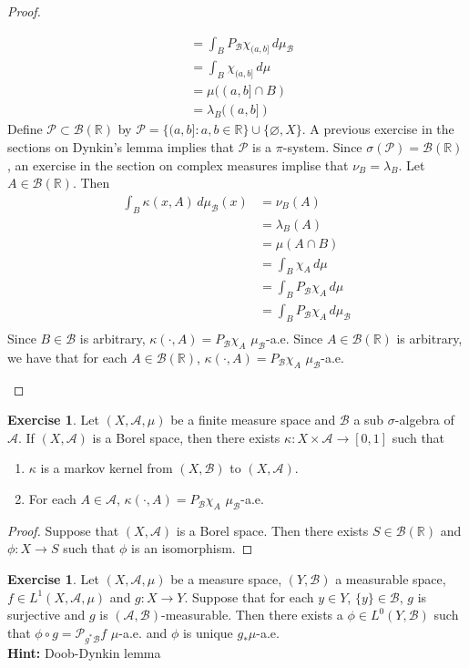 \documentclass[12pt]{amsart}
\theoremstyle{definition}
\newtheorem{ex}[definition]{Exercise}
\newcommand{\lam}{\lambda}
\newcommand{\sig}{\sigma}
\newcommand{\kap}{\kappa}
\newcommand{\R}{\mathbb{R}}
\newcommand{\MA}{\mathcal{A}}
\newcommand{\MB}{\mathcal{B}}
\newcommand{\MP}{\mathcal{P}}
\newcommand{\dmu}{\, d \mu}
\begin{document}
\begin{proof}
\begin{enumerate}
\begin{align*}
				& = \int_{B} P_{\MB}\chi_{(a, b]} \dmu_{\MB} \\
				& = \int_{B} \chi_{(a, b]} \dmu  \\
				& = \mu((a,b] \cap B) \\
				& = \lam_{B}((a,b])
			\end{align*}
			Define $\MP \subset \MB(\R)$ by $\MP = \{(a,b]: a,b \in \R\} \cup \{\varnothing, X\}$. A previous exercise in the sections on Dynkin's lemma implies that $\MP$ is a $\pi$-system. Since $\sig(\MP) = \MB(\R)$, an exercise in the section on complex measures implise that $\nu_{B} = \lam_{B}$. Let $A \in \MB(\R)$. Then 
			\begin{align*}
				\int_B \kap(x, A) \dmu_{\MB}(x) 
				& = \nu_B(A) \\
				& = \lam_{B}(A) \\
				& =  \mu(A \cap B) \\
				& = \int_B \chi_A \dmu \\
				& = \int_B P_{\MB} \chi_A \dmu \\
				& = \int_B P_{\MB} \chi_A \dmu_{\MB} \\
			\end{align*}
			Since $B \in \MB$ is arbitrary, $\kap(\cdot, A) = P_{\MB} \chi_A$ $\mu_{\MB}$-a.e. Since $A \in \MB(\R)$ is arbitrary, we have that for each $A \in \MB(\R)$, $\kap(\cdot, A) = P_{\MB} \chi_A$ $\mu_{\MB}$-a.e.
		\end{enumerate}
	\end{proof}

	\begin{ex}
		Let $(X, \MA, \mu)$ be a finite measure space and $\MB$ a sub $\sig$-algebra of $\MA$. If $(X, \MA)$ is a Borel space, then there exists $\kap: X \times \MA \rightarrow [0,1]$ such that 
		\begin{enumerate}
			\item $\kap$ is a markov kernel from $(X, \MB)$ to $(X, \MA)$.
			\item For each $A \in \MA$, $\kap(\cdot, A) = P_{\MB}\chi_{A}$ $\mu_{\MB}$-a.e.
		\end{enumerate}
	\end{ex}

	\begin{proof}
		Suppose that $(X, \MA)$ is a Borel space. Then there exists $S \in \MB(\R)$ and $\phi: X \rightarrow S$ such that $\phi$ is an isomorphism.
	\end{proof}
	
	\begin{ex} 
		Let $(X, \MA, \mu)$ be a measure space, $(Y, \MB)$ a measurable space, $f \in L^1(X, \MA, \mu)$ and $g: X \rightarrow Y$. Suppose that for each $y \in Y$, $\{y\} \in \MB$, $g$ is surjective and $g$ is $(\MA, \MB)$-measurable. Then there exists a $\phi \in L^0(Y, \MB)$ such that $\phi \circ g = \MP_{g^*\MB}f$ $\mu$-a.e. and $\phi$ is unique $g_*\mu$-a.e. \\
		\textbf{Hint:} Doob-Dynkin lemma
	\end{ex}	
	
\end{document}
